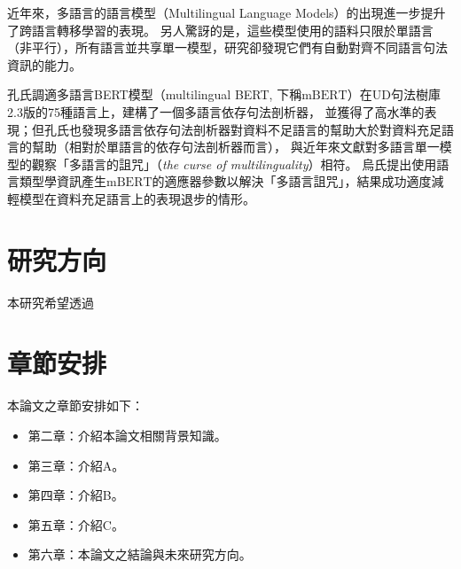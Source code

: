 近年來，多語言的語言模型（Multilingual Language Models）的出現進一步提升了跨語言轉移學習的表現\cite{devlin-etal-2019-bert,Conneau2019UnsupervisedCR}。
另人驚訝的是，這些模型使用的語料只限於單語言（非平行），所有語言並共享單一模型，研究卻發現它們有自動對齊不同語言句法資訊的能力\cite{chi2020finding}。

孔氏\cite{kondratyuk-straka-2019-75}調適多語言BERT模型\cite{devlin-etal-2019-bert}（multilingual BERT, 下稱$\mathrm{mBERT}$）在UD句法樹庫2.3版的75種語言上，建構了一個多語言依存句法剖析器，
並獲得了高水準的表現；但孔氏也發現多語言依存句法剖析器對資料不足語言的幫助大於對資料充足語言的幫助（相對於單語言的依存句法剖析器而言），
與近年來文獻對多語言單一模型的觀察「多語言的詛咒」（\textit{the curse of multilinguality}）相符。
烏氏\cite{ustun2020udapter}提出使用語言類型學資訊產生$\mathrm{mBERT}$的適應器\cite{rebuffi2018efficient,houlsby2019parameter}參數以解決「多語言詛咒」，結果成功適度減輕模型在資料充足語言上的表現退步的情形。
\section{研究方向}
本研究希望透過


\section{章節安排}
本論文之章節安排如下：

\begin{itemize}
\itemsep -2pt %
  \item  第二章：介紹本論文相關背景知識。
  \item  第三章：介紹A。
  \item  第四章：介紹B。
  \item  第五章：介紹C。
  \item  第六章：本論文之結論與未來研究方向。
\end{itemize}

